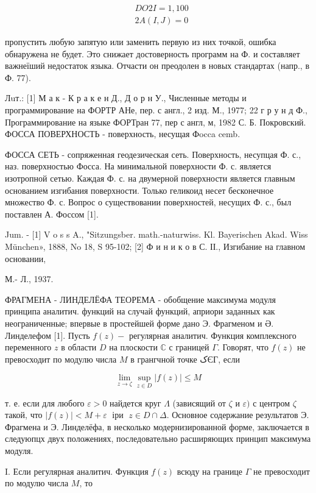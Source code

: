 \documentclass[10pt]{article}
\begin{document}
\[

\begin{aligned}

& D O 2 I=1,100 \\

& 2 A(I, J)=0

\end{aligned}

\]



пропустить любую запятую или заменить первую из них точкой, ошибка обнаружена не будет. Это снижает достоверность программ на Ф. и составляет важнеїший недостаток языка. Отчасти он преодолен в новых стандартах (напр., в Ф. 77).



Лuт.: [1] М а к - К р а к е н Д., Д о р н У., Численные методы и программирование на ФОРТР АНе, пер. с англ., 2 изд. М., 1977; 22 г р у н д Ф., Программирование на языке ФОРТран 77, пер с англ, м, 1982 С. Б. Покровский. ФОССА ПОВЕРХНОСТЬ - поверхность, несущая Фocca cemb.



ФОССА СЕТЬ - сопряженная геодезическая сеть. Поверхность, несупцая Ф. с., наз. поверхностью Фосса. На минимальной поверхности Ф. с. является изотропной сетью. Каждая Ф. с. на двумерной поверхности является главным основанием изгибания поверхности. Только геликоид несет бесконечное множество Ф. с. Вопрос о существовании поверхностей, несущих Ф. с., был поставлен А. Фоссом [1].



Jum. - [1] V o s s A., "Sitzungsber. math.-naturwiss. Kl. Bayerischen Akad. Wiss München», 1888, No 18, S 95-102; [2] Ф и н и к о в С. ІІ., Изгибание на главном основании,

М.- Л., 1937.



ФРАГМЕНА - ЛИНДЕЛЁФА ТЕОРЕМА - обобщение максимума модуля принципа аналитич. функций на случай функций, априори заданных как неограниченные; впервые в простейшей форме дано Э. Фрагменом и Ә. Линделефом [1]. Пусть $f(z)-$ регулярная аналитич. Функция комплексного переменного $z$ в области $D$ на плоскости $\mathbb{C}$ с границей $\Gamma$. Говорят, что $f(z)$ не превосходит по модулю числа $M$ в грангчной точке کЄГ, если



\[

\lim _{z \rightarrow \zeta} \sup _{z \in D}|f(z)| \leqslant M

\]



т. е. если для любого $\varepsilon>0$ найдется круг $\Lambda$ (зависящий от $\zeta$ и $\varepsilon)$ с центром $\zeta$ такой, что $|f(z)|<M+\varepsilon \operatorname{~іри~} z \in D \cap \Delta$. Основное содержание результатов Э. Фрагмена и Э. Линделёфа, в несколько модернизированной форме, заключается в следуюпцх двух положениях, последовательно расширяющих принцип максимума модуля.



I. Если регулярная аналитич. Функция $f(z)$ всюду на границе $\Gamma$ не превосходит по модулю числа $M$, то
\end{document}
